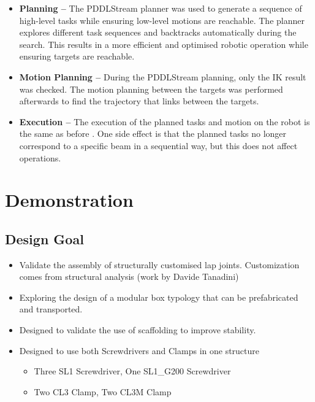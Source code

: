 \begin{itemize}
	\item \textbf{Planning --} The PDDLStream planner was used to generate a sequence of high-level tasks while ensuring low-level motions are reachable. The planner explores different task sequences and backtracks automatically during the search. This results in a more efficient and optimised robotic operation while ensuring targets are reachable.

	\item \textbf{Motion Planning --} During the PDDLStream planning, only the IK result was checked. The motion planning between the targets was performed afterwards to find the trajectory that links between the targets.

	\item \textbf{Execution --} The execution of the planned tasks and motion on the robot is the same as before . One side effect is that the planned tasks no longer correspond to a specific beam in a sequential way, but this does not affect operations.

\end{itemize}
\section{Demonstration}
\label{section:exploration-5-demonstration}

\subsection{Design Goal}
\label{subsection:exploration-5-design-goal}

\begin{itemize}
	\item Validate the assembly of structurally customised lap joints. Customization comes from structural analysis (work by Davide Tanadini)

	\item Exploring the design of a modular box typology that can be prefabricated and transported.

	\item Designed to validate the use of scaffolding to improve stability.

	\item Designed to use both Screwdrivers and Clamps in one structure

\begin{itemize}
	\item Three SL1 Screwdriver, One SL1\_G200 Screwdriver

	\item Two CL3 Clamp, Two CL3M Clamp

\end{itemize}
\end{itemize}
